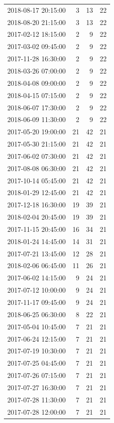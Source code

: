 \begin{tabular}{lrrr}
2018-08-17 20:15:00 & 3 & 13 & 22 \\
2018-08-20 21:15:00 & 3 & 13 & 22 \\
2017-02-12 18:15:00 & 2 & 9 & 22 \\
2017-03-02 09:45:00 & 2 & 9 & 22 \\
2017-11-28 16:30:00 & 2 & 9 & 22 \\
2018-03-26 07:00:00 & 2 & 9 & 22 \\
2018-04-08 09:00:00 & 2 & 9 & 22 \\
2018-04-15 07:15:00 & 2 & 9 & 22 \\
2018-06-07 17:30:00 & 2 & 9 & 22 \\
2018-06-09 11:30:00 & 2 & 9 & 22 \\
2017-05-20 19:00:00 & 21 & 42 & 21 \\
2017-05-30 21:15:00 & 21 & 42 & 21 \\
2017-06-02 07:30:00 & 21 & 42 & 21 \\
2017-08-08 06:30:00 & 21 & 42 & 21 \\
2017-10-14 05:45:00 & 21 & 42 & 21 \\
2018-01-29 12:45:00 & 21 & 42 & 21 \\
2017-12-18 16:30:00 & 19 & 39 & 21 \\
2018-02-04 20:45:00 & 19 & 39 & 21 \\
2017-11-15 20:45:00 & 16 & 34 & 21 \\
2018-01-24 14:45:00 & 14 & 31 & 21 \\
2017-07-21 13:45:00 & 12 & 28 & 21 \\
2018-02-06 06:45:00 & 11 & 26 & 21 \\
2017-06-02 14:15:00 & 9 & 24 & 21 \\
2017-07-12 10:00:00 & 9 & 24 & 21 \\
2017-11-17 09:45:00 & 9 & 24 & 21 \\
2018-06-25 06:30:00 & 8 & 22 & 21 \\
2017-05-04 10:45:00 & 7 & 21 & 21 \\
2017-06-24 12:15:00 & 7 & 21 & 21 \\
2017-07-19 10:30:00 & 7 & 21 & 21 \\
2017-07-25 04:45:00 & 7 & 21 & 21 \\
2017-07-26 07:15:00 & 7 & 21 & 21 \\
2017-07-27 16:30:00 & 7 & 21 & 21 \\
2017-07-28 11:30:00 & 7 & 21 & 21 \\
2017-07-28 12:00:00 & 7 & 21 & 21 \\

\end{tabular}
